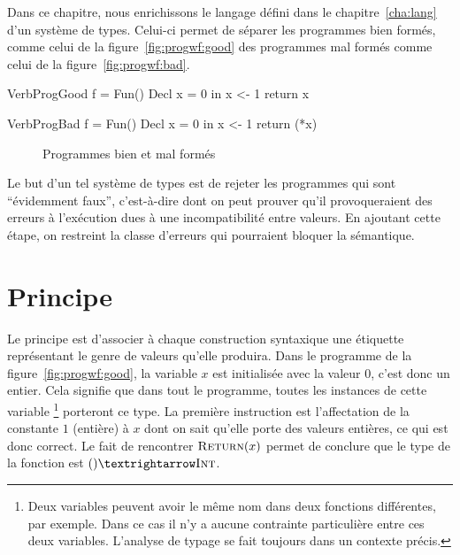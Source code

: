 Dans ce chapitre, nous enrichissons le langage défini dans le
chapitre~\ref{cha:lang} d'un système de types. Celui-ci permet de séparer les
programmes bien formés, comme celui de la figure~\ref{fig:progwf:good} des
programmes mal formés comme celui de la figure~\ref{fig:progwf:bad}.

\begin{SaveVerbatim}[]{VerbProgGood}
f = Fun() {
  Decl x = 0 in
  x <- 1
  return x
}
\end{SaveVerbatim}

\begin{SaveVerbatim}[]{VerbProgBad}
f = Fun() {
  Decl x = 0 in
  x <- 1
  return (*x)
}
\end{SaveVerbatim}

\begin{figure}[h]

  \centering

  \hspace{2cm}

  \caption{Programmes bien et mal formés}
\label{fig:progwf}

\end{figure}

Le but d'un tel système de types est de rejeter les programmes qui sont
``évidemment faux'', c'est-à-dire dont on peut prouver qu'il provoqueraient des
erreurs à l'exécution dues à une incompatibilité entre valeurs. En ajoutant
cette étape, on restreint la classe d'erreurs qui pourraient bloquer la
sémantique.

\section{Principe}

Le principe est d'associer à chaque construction syntaxique une étiquette
représentant le genre de valeurs qu'elle produira. Dans le programme de la
figure~\ref{fig:progwf:good}, la variable $x$ est initialisée avec la valeur
$0$, c'est donc un entier. Cela signifie que dans tout le programme, toutes les
instances de cette variable
\footnote{Deux variables peuvent avoir le même nom dans deux fonctions
  différentes, par exemple. Dans ce cas il n'y a aucune contrainte particulière
  entre ces deux variables. L'analyse de typage se fait toujours dans un
  contexte précis.
}
porteront ce type. La première instruction est l'affectation de la constante $1$
(entière) à $x$ dont on sait qu'elle porte des valeurs entières, ce qui est donc
correct. Le fait de rencontrer $\textsc{Return}(x)$ permet de conclure que le type de
la fonction est $() → \tInt$.

